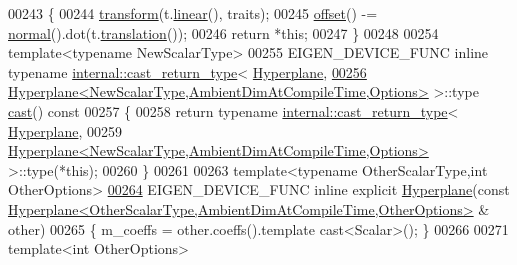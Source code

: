 \begin{DoxyCode}
00243   \{
00244     \hyperlink{group___geometry___module_a44d7ad009a496f78636ce69f611f2003}{transform}(t.\hyperlink{group___geometry___module_a535bd63d047c2a36585c3f9b62219a1e}{linear}(), traits);
00245     \hyperlink{group___geometry___module_afe2eadf3679e4a802c0e02c15049aed9}{offset}() -= \hyperlink{group___geometry___module_ad3da930fc7025604f2f174651089b2a8}{normal}().dot(t.\hyperlink{group___geometry___module_afa93ba97d26912bb3d8777cbed102045}{translation}());
00246     \textcolor{keywordflow}{return} *\textcolor{keyword}{this};
00247   \}
00248 
00254   \textcolor{keyword}{template}<\textcolor{keyword}{typename} NewScalarType>
00255   EIGEN\_DEVICE\_FUNC \textcolor{keyword}{inline} \textcolor{keyword}{typename} \hyperlink{struct_eigen_1_1internal_1_1cast__return__type}{internal::cast\_return\_type}<
      \hyperlink{group___geometry___module_a98d2a770332eec864a897a8ef5bb6025}{Hyperplane},
\hyperlink{group___geometry___module_aa3b0071864745e33f3a7b75bb308bd46}{00256}            \hyperlink{group___geometry___module_class_eigen_1_1_hyperplane}{Hyperplane<NewScalarType,AmbientDimAtCompileTime,Options>}
       >::type \hyperlink{group___geometry___module_aa3b0071864745e33f3a7b75bb308bd46}{cast}()\textcolor{keyword}{ const}
00257 \textcolor{keyword}{  }\{
00258     \textcolor{keywordflow}{return} \textcolor{keyword}{typename} \hyperlink{struct_eigen_1_1internal_1_1cast__return__type}{internal::cast\_return\_type}<
      \hyperlink{group___geometry___module_a98d2a770332eec864a897a8ef5bb6025}{Hyperplane},
00259                     \hyperlink{group___geometry___module_class_eigen_1_1_hyperplane}{Hyperplane<NewScalarType,AmbientDimAtCompileTime,Options>}
       >::type(*\textcolor{keyword}{this});
00260   \}
00261 
00263   \textcolor{keyword}{template}<\textcolor{keyword}{typename} OtherScalarType,\textcolor{keywordtype}{int} OtherOptions>
\hyperlink{group___geometry___module_ad4c2c28d6a4c74218c788094ed072264}{00264}   EIGEN\_DEVICE\_FUNC \textcolor{keyword}{inline} \textcolor{keyword}{explicit} \hyperlink{group___geometry___module_ad4c2c28d6a4c74218c788094ed072264}{Hyperplane}(\textcolor{keyword}{const} 
      \hyperlink{group___geometry___module_class_eigen_1_1_hyperplane}{Hyperplane<OtherScalarType,AmbientDimAtCompileTime,OtherOptions>}
      & other)
00265   \{ m\_coeffs = other.coeffs().template cast<Scalar>(); \}
00266 
00271   \textcolor{keyword}{template}<\textcolor{keywordtype}{int} OtherOptions>

\end{DoxyCode}

